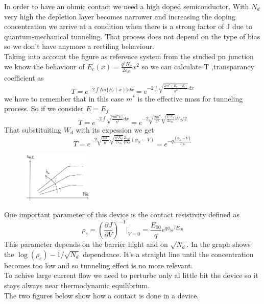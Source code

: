 In order to have an ohmic contact we need a high doped semiconductor. With $N_d$ very high the depletion layer becomes narrower and increasing the doping concentration we arrive at a condition when there is a strong factor of J due to quantum-mechanical tunneling. That process does not depend on the type of bias so we don't have anymore a rectifing behaviour.\\
Taking into account the figure as reference system from the studied pn junction we know the behaviour of $E_c(x)=\frac{q^2N_d}{2\varepsilon_{Si}}x^2$ so we can calculate T ,transparancy coefficient as 
\begin{equation}
T=e^{-2\int Im\{E_c(x)\}dx}=e^{-2\int \sqrt{\frac{2m^*(E_c-E)}{\hslash^2}}dx}
\end{equation}
we have to remember that in this case $m^*$ is the effective mass for tunneling process. So if we consider $E=E_f$
\begin{equation}
T=e^{-2\int \sqrt{\frac{2m^*E_c}{\hslash^2}}dx}=e^{-2\sqrt{\frac{2m^*}{\hslash^2}}\sqrt{\frac{q^2N_d}{2\varepsilon_{Si}}}W_d/2}
\end{equation}
That substituiting $W_d$ with its expession we get
\begin{equation}
T=e^{-2\sqrt{\frac{2m^*}{\hslash^2}}\sqrt{\frac{q^2N_d}{2\varepsilon_{Si}}}\frac{2\varepsilon_{Si}}{qN_d}(\phi_{bi}-V)}=e^{-q \frac{(\phi_{bi}-V)}{E_{00}}}
\end{equation}

\begin{figure}
\includegraphics[width=0.3\textwidth]{contactrho.png}
\end{figure}

One important parameter of this device is the contact resistivity defined as 
\begin{equation}
\rho_c=(\frac{\partial J }{\partial V})^{-1}|_{V=0}=\frac{E_{00}}{q}e^{q\phi_{bi}/E_{00}}
\end{equation}
This parameter depends on the barrier hight and on $\sqrt{N_d}$. In the graph shows the $\log (\rho_c) - 1/\sqrt{N_d}$ dependance. It's a straight line until the concentration becomes too low and so tunneling effect is no more relevant.\\
To achive large current flow we need to perturbe only al little bit the device so it stays always near thermodynamic equilibrium.\\
The two figures below show how a contact is done in a device.

